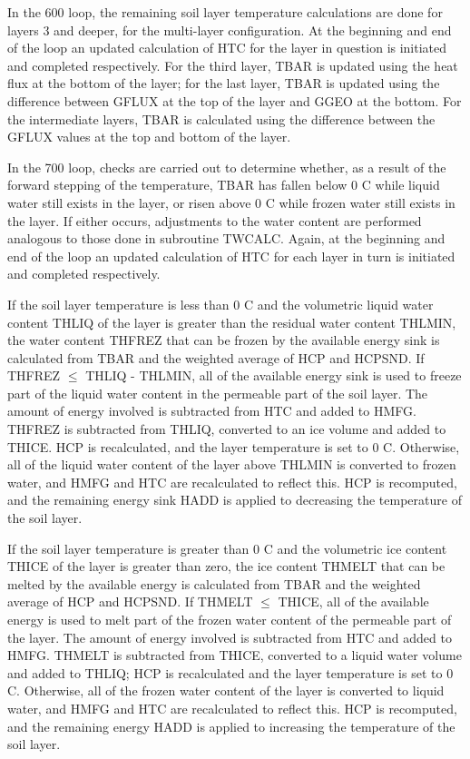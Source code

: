 In the 600 loop, the remaining soil layer temperature calculations are done for layers 3 and deeper, for the multi-\/layer configuration. At the beginning and end of the loop an updated calculation of H\+T\+C for the layer in question is initiated and completed respectively. For the third layer, T\+B\+A\+R is updated using the heat flux at the bottom of the layer; for the last layer, T\+B\+A\+R is updated using the difference between G\+F\+L\+U\+X at the top of the layer and G\+G\+E\+O at the bottom. For the intermediate layers, T\+B\+A\+R is calculated using the difference between the G\+F\+L\+U\+X values at the top and bottom of the layer.

In the 700 loop, checks are carried out to determine whether, as a result of the forward stepping of the temperature, T\+B\+A\+R has fallen below 0 C while liquid water still exists in the layer, or risen above 0 C while frozen water still exists in the layer. If either occurs, adjustments to the water content are performed analogous to those done in subroutine T\+W\+C\+A\+L\+C. Again, at the beginning and end of the loop an updated calculation of H\+T\+C for each layer in turn is initiated and completed respectively.

If the soil layer temperature is less than 0 C and the volumetric liquid water content T\+H\+L\+I\+Q of the layer is greater than the residual water content T\+H\+L\+M\+I\+N, the water content T\+H\+F\+R\+E\+Z that can be frozen by the available energy sink is calculated from T\+B\+A\+R and the weighted average of H\+C\+P and H\+C\+P\+S\+N\+D. If T\+H\+F\+R\+E\+Z $\leq$ T\+H\+L\+I\+Q -\/ T\+H\+L\+M\+I\+N, all of the available energy sink is used to freeze part of the liquid water content in the permeable part of the soil layer. The amount of energy involved is subtracted from H\+T\+C and added to H\+M\+F\+G. T\+H\+F\+R\+E\+Z is subtracted from T\+H\+L\+I\+Q, converted to an ice volume and added to T\+H\+I\+C\+E. H\+C\+P is recalculated, and the layer temperature is set to 0 C. Otherwise, all of the liquid water content of the layer above T\+H\+L\+M\+I\+N is converted to frozen water, and H\+M\+F\+G and H\+T\+C are recalculated to reflect this. H\+C\+P is recomputed, and the remaining energy sink H\+A\+D\+D is applied to decreasing the temperature of the soil layer.

If the soil layer temperature is greater than 0 C and the volumetric ice content T\+H\+I\+C\+E of the layer is greater than zero, the ice content T\+H\+M\+E\+L\+T that can be melted by the available energy is calculated from T\+B\+A\+R and the weighted average of H\+C\+P and H\+C\+P\+S\+N\+D. If T\+H\+M\+E\+L\+T $\leq$ T\+H\+I\+C\+E, all of the available energy is used to melt part of the frozen water content of the permeable part of the layer. The amount of energy involved is subtracted from H\+T\+C and added to H\+M\+F\+G. T\+H\+M\+E\+L\+T is subtracted from T\+H\+I\+C\+E, converted to a liquid water volume and added to T\+H\+L\+I\+Q; H\+C\+P is recalculated and the layer temperature is set to 0 C. Otherwise, all of the frozen water content of the layer is converted to liquid water, and H\+M\+F\+G and H\+T\+C are recalculated to reflect this. H\+C\+P is recomputed, and the remaining energy H\+A\+D\+D is applied to increasing the temperature of the soil layer.